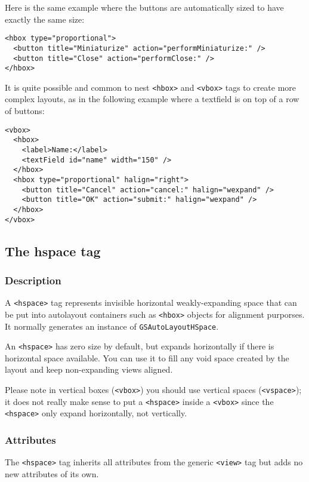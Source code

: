 Here is the same example where the buttons are automatically sized
to have exactly the same size:
\begin{verbatim}
<hbox type="proportional">
  <button title="Miniaturize" action="performMiniaturize:" />
  <button title="Close" action="performClose:" />
</hbox>
\end{verbatim}

It is quite possible and common to nest \texttt{<hbox>} and
\texttt{<vbox>} tags to create more complex layouts, as in the
following example where a textfield is on top of a row
of buttons:
\begin{verbatim}
<vbox>
  <hbox>
    <label>Name:</label>
    <textField id="name" width="150" />
  </hbox>
  <hbox type="proportional" halign="right">
    <button title="Cancel" action="cancel:" halign="wexpand" />
    <button title="OK" action="submit:" halign="wexpand" />
  </hbox>
</vbox>
\end{verbatim}

\subsection{The hspace tag}

\subsubsection{Description}

A \texttt{<hspace>} tag represents invisible horizontal
weakly-expanding space that can be put into autolayout containers such
as \texttt{<hbox>} objects for alignment purporses.  It normally
generates an instance of \texttt{GSAutoLayoutHSpace}.

An \texttt{<hspace>} has zero size by default, but expands
horizontally if there is horizontal space available.  You can use it
to fill any void space created by the layout and keep non-expanding
views aligned.

Please note in vertical boxes (\texttt{<vbox>}) you should use
vertical spaces (\texttt{<vspace>}); it does not really make sense to
put a \texttt{<hspace>} inside a \texttt{<vbox>} since the
\texttt{<hspace>} only expand horizontally, not vertically.

\subsubsection{Attributes}
The \texttt{<hspace>} tag inherits all attributes from the generic
\texttt{<view>} tag but adds no new attributes of its own.

